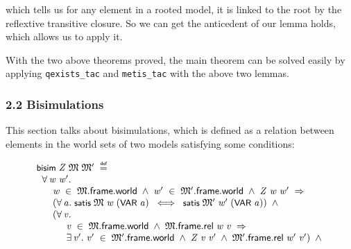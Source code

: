 \documentclass[letterpaper]{article}
\renewcommand{\HOLConst}[1]{{\textsf{\upshape\small #1}}}
\newenvironment{holmath}{\begin{displaymath}\begin{array}{l}}{\end{array}\end{displaymath}\ignorespacesafterend}
\begin{document}
which tells us for any element in a rooted model, it is linked to the root by the reflextive transitive closure. So we can get the anticedent of our lemma holds, which allows us to apply it.

With the two above theorems proved, the main theorem can be solved easily by applying \texttt{qexists_tac} and \texttt{metis_tac} with the above two lemmas.

\subsubsection{2.2 Bisimulations}

This section talks about bisimulations, which is defined as a relation between elements in the world sets of two models satisfying some conditions:

\begin{holmath}
  \HOLConst{bisim}\;\HOLFreeVar{Z}\;\HOLFreeVar{\ensuremath{\mathfrak{M}}}\;\HOLFreeVar{\ensuremath{\mathfrak{M}'}}\;\HOLSymConst{\HOLTokenDefEquality{}}\\
\;\;\HOLSymConst{\HOLTokenForall{}}\HOLBoundVar{w}\;\HOLBoundVar{w\sp{\prime}}.\\
\;\;\;\;\;\;\HOLBoundVar{w}\;\HOLSymConst{\HOLTokenIn{}}\;\HOLFreeVar{\ensuremath{\mathfrak{M}}}.\HOLFieldName{frame}.\HOLFieldName{world}\;\HOLSymConst{\HOLTokenConj{}}\;\HOLBoundVar{w\sp{\prime}}\;\HOLSymConst{\HOLTokenIn{}}\;\HOLFreeVar{\ensuremath{\mathfrak{M}'}}.\HOLFieldName{frame}.\HOLFieldName{world}\;\HOLSymConst{\HOLTokenConj{}}\;\HOLFreeVar{Z}\;\HOLBoundVar{w}\;\HOLBoundVar{w\sp{\prime}}\;\HOLSymConst{\HOLTokenImp{}}\\
\;\;\;\;\;\;(\HOLSymConst{\HOLTokenForall{}}\HOLBoundVar{a}.\;\HOLConst{satis}\;\HOLFreeVar{\ensuremath{\mathfrak{M}}}\;\HOLBoundVar{w}\;(\HOLConst{VAR}\;\HOLBoundVar{a})\;\HOLSymConst{\HOLTokenEquiv{}}\;\HOLConst{satis}\;\HOLFreeVar{\ensuremath{\mathfrak{M}'}}\;\HOLBoundVar{w\sp{\prime}}\;(\HOLConst{VAR}\;\HOLBoundVar{a}))\;\HOLSymConst{\HOLTokenConj{}}\\
\;\;\;\;\;\;(\HOLSymConst{\HOLTokenForall{}}\HOLBoundVar{v}.\\
\;\;\;\;\;\;\;\;\;\;\;\HOLBoundVar{v}\;\HOLSymConst{\HOLTokenIn{}}\;\HOLFreeVar{\ensuremath{\mathfrak{M}}}.\HOLFieldName{frame}.\HOLFieldName{world}\;\HOLSymConst{\HOLTokenConj{}}\;\HOLFreeVar{\ensuremath{\mathfrak{M}}}.\HOLFieldName{frame}.\HOLFieldName{rel}\;\HOLBoundVar{w}\;\HOLBoundVar{v}\;\HOLSymConst{\HOLTokenImp{}}\\
\;\;\;\;\;\;\;\;\;\;\;\HOLSymConst{\HOLTokenExists{}}\HOLBoundVar{v\sp{\prime}}.\;\HOLBoundVar{v\sp{\prime}}\;\HOLSymConst{\HOLTokenIn{}}\;\HOLFreeVar{\ensuremath{\mathfrak{M}'}}.\HOLFieldName{frame}.\HOLFieldName{world}\;\HOLSymConst{\HOLTokenConj{}}\;\HOLFreeVar{Z}\;\HOLBoundVar{v}\;\HOLBoundVar{v\sp{\prime}}\;\HOLSymConst{\HOLTokenConj{}}\;\HOLFreeVar{\ensuremath{\mathfrak{M}'}}.\HOLFieldName{frame}.\HOLFieldName{rel}\;\HOLBoundVar{w\sp{\prime}}\;\HOLBoundVar{v\sp{\prime}})\;\HOLSymConst{\HOLTokenConj{}}\\

\end{holmath}
\end{document}
